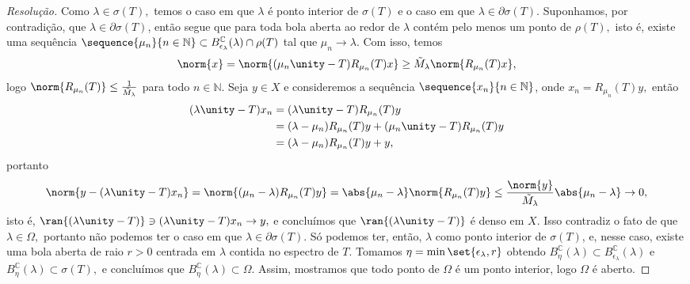 \begin{proof}[Resolução]
  Como \(\lambda \in \sigma(T),\) temos o caso em que \(\lambda\) é ponto interior de \(\sigma(T)\) e o caso em que \(\lambda \in \partial\sigma(T).\)  Suponhamos, por contradição, que \(\lambda \in \partial \sigma(T)\), então segue que para toda bola aberta ao redor de \(\lambda\) contém pelo menos um ponto de \(\rho(T),\) isto é, existe uma sequência \(\sequence{\mu_n}{n\in\mathbb{N}} \subset B_{\epsilon_\lambda}^\mathbb{C}(\lambda) \cap \rho(T)\) tal que \(\mu_n \to \lambda.\) Com isso, temos
  \begin{equation*}
    \norm{x} = \norm{(\mu_n \unity - T)R_{\mu_n}(T)x} \geq \tilde{M}_{\lambda} \norm{R_{\mu_n}(T)x},
  \end{equation*}
  logo \(\norm{R_{\mu_n}(T)} \leq \frac{1}{\tilde{M}_\lambda}\) para todo \(n \in \mathbb{N}.\) Seja \(y \in X\) e consideremos a sequência \(\sequence{x_n}{n \in \mathbb{N}}\), onde \(x_n = R_{\mu_n}(T)y,\) então
  \begin{align*}
    (\lambda \unity - T)x_n &= (\lambda \unity - T) R_{\mu_n}(T) y \\
                            &= (\lambda - \mu_n) R_{\mu_n}(T) y + (\mu_n \unity - T) R_{\mu_n}(T) y\\
                            &= (\lambda - \mu_n) R_{\mu_n}(T) y + y,
  \end{align*}
  portanto
  \begin{equation*}
    \norm{y - (\lambda \unity - T) x_n} = \norm{(\mu_n - \lambda) R_{\mu_n}(T) y} = \abs{\mu_n - \lambda} \norm{R_{\mu_n}(T)y} \leq \frac{\norm{y}}{\tilde{M}_\lambda} \abs{\mu_n - \lambda} \to 0,
  \end{equation*}
  isto é, \(\ran{(\lambda \unity - T)} \ni (\lambda \unity - T)x_n \to y,\) e concluímos que \(\ran{(\lambda \unity - T)}\) é denso em \(X.\) Isso contradiz o fato de que \(\lambda \in \Omega,\) portanto não podemos ter o caso em que \(\lambda \in \partial \sigma(T).\) Só podemos ter, então, \(\lambda\) como ponto interior de \(\sigma(T)\), e, nesse caso, existe uma bola aberta de raio \(r > 0\) centrada em \(\lambda\) contida no espectro de \(T.\) Tomamos \(\eta = \min\set{\epsilon_\lambda, r}\) obtendo \(B_{\eta}^\mathbb{C}(\lambda) \subset B_{\epsilon_\lambda}^\mathbb{C}(\lambda)\) e \(B_{\eta}^\mathbb{C}(\lambda) \subset \sigma(T),\) e concluímos que \(B_{\eta}^\mathbb{C}(\lambda) \subset \Omega.\) Assim, mostramos que todo ponto de \(\Omega\) é um ponto interior, logo \(\Omega\) é aberto.
\end{proof}
